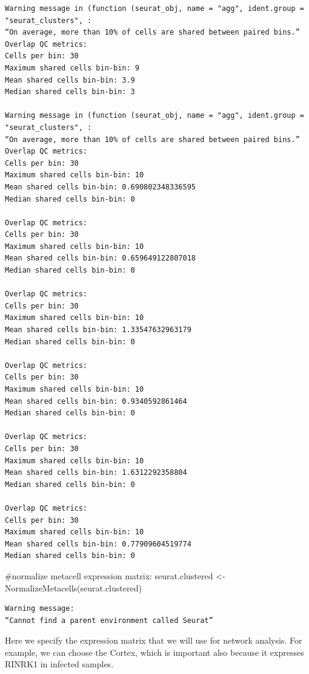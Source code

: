 \documentclass[
  letterpaper,
  DIV=11,
  numbers=noendperiod]{scrartcl}
\newenvironment{Shaded}{\begin{snugshade}}{\end{snugshade}}
\newcommand{\CommentTok}[1]{\textcolor[rgb]{0.37,0.37,0.37}{#1}}
\newcommand{\FunctionTok}[1]{\textcolor[rgb]{0.28,0.35,0.67}{#1}}
\newcommand{\NormalTok}[1]{\textcolor[rgb]{0.00,0.23,0.31}{#1}}
\newcommand{\OtherTok}[1]{\textcolor[rgb]{0.00,0.23,0.31}{#1}}
\begin{document}
\begin{verbatim}
Warning message in (function (seurat_obj, name = "agg", ident.group = "seurat_clusters", :
“On average, more than 10% of cells are shared between paired bins.”
Overlap QC metrics:
Cells per bin: 30
Maximum shared cells bin-bin: 9
Mean shared cells bin-bin: 3.9
Median shared cells bin-bin: 3

Warning message in (function (seurat_obj, name = "agg", ident.group = "seurat_clusters", :
“On average, more than 10% of cells are shared between paired bins.”
Overlap QC metrics:
Cells per bin: 30
Maximum shared cells bin-bin: 10
Mean shared cells bin-bin: 0.690802348336595
Median shared cells bin-bin: 0

Overlap QC metrics:
Cells per bin: 30
Maximum shared cells bin-bin: 10
Mean shared cells bin-bin: 0.659649122807018
Median shared cells bin-bin: 0

Overlap QC metrics:
Cells per bin: 30
Maximum shared cells bin-bin: 10
Mean shared cells bin-bin: 1.33547632963179
Median shared cells bin-bin: 0

Overlap QC metrics:
Cells per bin: 30
Maximum shared cells bin-bin: 10
Mean shared cells bin-bin: 0.9340592861464
Median shared cells bin-bin: 0

Overlap QC metrics:
Cells per bin: 30
Maximum shared cells bin-bin: 10
Mean shared cells bin-bin: 1.6312292358804
Median shared cells bin-bin: 0

Overlap QC metrics:
Cells per bin: 30
Maximum shared cells bin-bin: 10
Mean shared cells bin-bin: 0.77909604519774
Median shared cells bin-bin: 0
\end{verbatim}

\begin{Shaded}
\begin{Highlighting}[]
\CommentTok{\#normalize metacell expression matrix:}
\NormalTok{seurat.clustered }\OtherTok{\textless{}{-}} \FunctionTok{NormalizeMetacells}\NormalTok{(seurat.clustered)}
\end{Highlighting}
\end{Shaded}

\begin{verbatim}
Warning message:
“Cannot find a parent environment called Seurat”
\end{verbatim}

Here we specify the expression matrix that we will use for network
analysis. For example, we can choose the Cortex, which is important also
because it expresses RINRK1 in infected samples.
\end{document}
